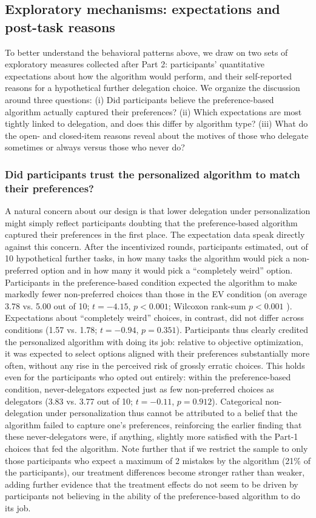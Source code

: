 \documentclass[a4paper, 12pt, fleqn]{article}
\theoremstyle{definition}
\begin{document}
\subsection{Exploratory mechanisms: expectations and post-task reasons}
\label{sec:exploratory_mechanisms}
To better understand the behavioral patterns above, we draw on two sets of exploratory measures collected after Part 2: participants' quantitative expectations about how the algorithm would perform, and their self-reported reasons for a hypothetical further delegation choice. We organize the discussion around three questions: (i) Did participants believe the preference-based algorithm actually captured their preferences? (ii) Which expectations are most tightly linked to delegation, and does this differ by algorithm type? (iii) What do the open- and closed-item reasons reveal about the motives of those who delegate sometimes or always versus those who never do?

\subsubsection*{Did participants trust the personalized algorithm to match their preferences?}
A natural concern about our design is that lower delegation under personalization might simply reflect participants doubting that the preference-based algorithm captured their preferences in the first place. The expectation data speak directly against this concern. After the incentivized rounds, participants estimated, out of 10 hypothetical further tasks, in how many tasks the algorithm would pick a non-preferred option and in how many it would pick a ``completely weird'' option. Participants in the preference-based condition expected the algorithm to make markedly fewer non-preferred choices than those in the EV condition (on average 3.78 vs. 5.00 out of 10; $t = -4.15$, $p < 0.001$; Wilcoxon rank-sum $p < 0.001$%
). Expectations about ``completely weird'' choices, in contrast, did not differ across conditions (1.57 vs. 1.78; $t = -0.94$, $p = 0.351$). Participants thus clearly credited the personalized algorithm with doing its job: relative to objective optimization, it was expected to select options aligned with their preferences substantially more often, without any rise in the perceived risk of grossly erratic choices. This holds even for the participants who opted out entirely: within the preference-based condition, never-delegators expected just as few non-preferred choices as delegators (3.83 vs. 3.77 out of 10; $t = -0.11$, $p = 0.912$). Categorical non-delegation under personalization thus cannot be attributed to a belief that the algorithm failed to capture one's preferences, reinforcing the earlier finding that these never-delegators were, if anything, slightly more satisfied with the Part-1 choices that fed the algorithm. Note further that if we restrict the sample to only those participants who expect a maximum of 2 mistakes by the algorithm (21\% of the participants), our treatment differences become stronger rather than weaker, adding further evidence that the treatment effects do not seem to be driven by participants not believing in the ability of the preference-based algorithm to do its job.
\end{document}
